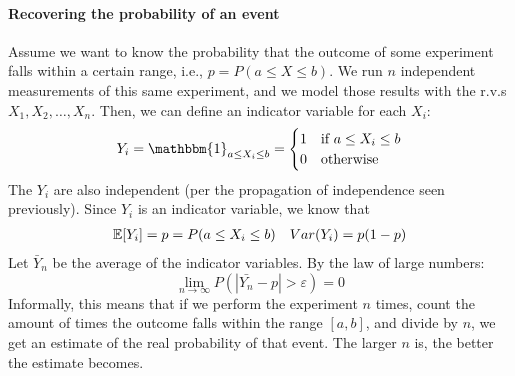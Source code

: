 \paragraph{Recovering the probability of an event} Assume we want to know the probability that the outcome of some experiment falls within a certain range, i.e., $p = P(a \leq X \leq b)$. We run $n$ independent measurements of this same experiment, and we model those results with the r.v.s $X_1, X_2, \dots, X_n$. Then, we can define an indicator variable for each $X_i$:
\begin{equation*}
    Y_i = \mathbbm{1}_{a \leq X_i \leq b} = \begin{cases}
        1 & \text{if } a \leq X_i \leq b\\
        0 & \text{otherwise}
    \end{cases}
\end{equation*}
The $Y_i$ are also independent (per the propagation of independence seen previously). Since $Y_i$ is an indicator variable, we know that
\begin{align*}
    &\mathbb{E}[Y_i] = p = P(a \leq X_i \leq b) &Var(Y_i) = p(1 - p)
\end{align*}
Let $\bar{Y}_n$ be the average of the indicator variables. By the law of large numbers:
\begin{equation*}
    \lim_{n \to \infty} P(|\bar{Y_n} - p| > \varepsilon) = 0
\end{equation*}
Informally, this means that if we perform the experiment $n$ times, count the amount of times the outcome falls within the range $[a, b]$, and divide by $n$, we get an estimate of the real probability of that event. The larger $n$ is, the better the estimate becomes.


